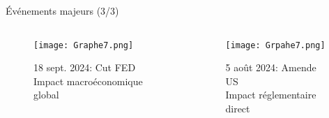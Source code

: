 \documentclass[aspectratio=169]{beamer}  %
\begin{document}
\begin{frame}{Événements majeurs (3/3)}
    \begin{columns}
        \begin{column}{0.48\textwidth}
            \begin{figure}
                \centering
                \texttt{[image: Graphe7.png]}
                \caption{18 sept. 2024: Cut FED\\
                Impact macroéconomique global}
            \end{figure}
        \end{column}
        \begin{column}{0.48\textwidth}
            \begin{figure}
                \centering
                \texttt{[image: Grpahe7.png]}
                \caption{5 août 2024: Amende US\\
                Impact réglementaire direct}
            \end{figure}
        \end{column}
    \end{columns}
\end{frame}
\end{document}
